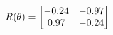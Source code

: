 \documentclass[preview]{standalone}
\begin{document}
\begin{align*}
\special{dvisvgm:raw <g id='unique000'>}R(\theta) = \begin{bmatrix}-0.24 & -0.97\\0.97 & -0.24\end{bmatrix}\special{dvisvgm:raw </g>}
\end{align*}
\end{document}
